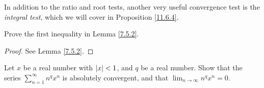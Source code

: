\begin{remark}\label{7.5.5}
    In addition to the ratio and root tests, another very useful convergence test is the \emph{integral test}, which we will cover in Proposition \ref{11.6.4}.
\end{remark}

\exercisesection

\begin{exercise}\label{ex 7.5.1}
    Prove the first inequality in Lemma \ref{7.5.2}.
\end{exercise}

\begin{proof}
    See Lemma \ref{7.5.2}.
\end{proof}

\begin{exercise}\label{ex 7.5.2}
    Let \(x\) be a real number with \(\abs*{x} < 1\), and \(q\) be a real number.
    Show that the series \(\sum_{n = 1}^\infty n^q x^n\) is absolutely convergent, and that \(\lim_{n \to \infty} n^q x^n = 0\).
\end{exercise}

